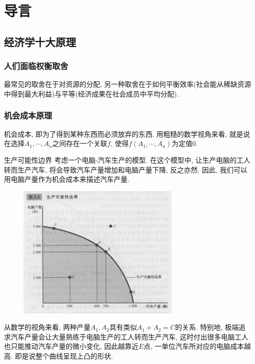 \chapter{导言}

\section{经济学十大原理}

\subsection*{人们面临权衡取舍}

最常见的取舍在于对资源的分配, 另一种取舍在于如何平衡效率(社会能从稀缺资源中得到最大利益)与平等(经济成果在社会成员中平均分配). 

\subsection*{机会成本原理}

机会成本, 即为了得到某种东西而必须放弃的东西. 用粗糙的数学视角来看, 就是说在选择$A_1,\cdots ,A_n$之间存在一个关联$f$, 使得$f(A_1,\cdots ,A_n)$为定值$0$. 

\begin{example}{生产可能性边界}
	考虑一个电脑-汽车生产的模型. 在这个模型中, 让生产电脑的工人转而生产汽车, 将会导致汽车产量增加和电脑产量下降, 反之亦然. 因此, 我们可以用电脑产量作为机会成本来描述汽车产量. 
	\begin{figure}[H]
		\centering
		\includegraphics[width=8cm]{attachment/Fig2_2.png}
	\end{figure}
	从数学的视角来看, 两种产量$A_1,A_2$具有类似$A_1+A_2=C$的关系. 特别地, 极端追求汽车产量会让大量熟练于电脑生产的工人转而生产汽车, 这时付出很多电脑工人也只能推动汽车产量的微小变化, 因此越靠近$E$点, 一单位汽车所对应的电脑成本越高. 即是说整个曲线呈现上凸的形状. 
\end{example}

